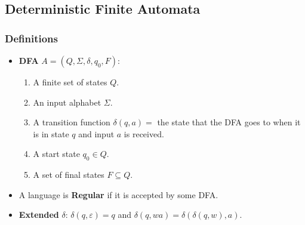 \subsection{\color{ForestGreen}Deterministic Finite Automata}
\subsubsection{Definitions}
\begin{itemize}
\item \textbf{DFA} $A = (Q, \Sigma, \delta, q_0, F)$:
\begin{enumerate}
    \item A finite set of states $Q$.
    \item An input alphabet $\Sigma$.
    \item A transition function $\delta (q, a) =$ the state that the DFA goes to when it is in state $q$ and input $a$ is received.
    \item A start state $q_0 \in Q$.
    \item A set of final states $F \subseteq Q$.
\end{enumerate}

    \item A language is \textbf{Regular} if it is accepted by some DFA.
    \item \textbf{Extended} \( \delta  \): \( \delta (q,\varepsilon ) = q \) and \( \delta (q, wa) = \delta (\delta (q,w), a) \).
\end{itemize}
